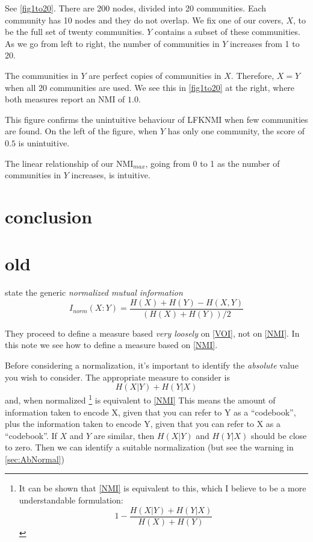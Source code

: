 \documentclass[9pt,technote]{IEEEtran}
\begin{document}
See \cref{fig1to20}. There are 200 nodes, divided into 20 communities. Each community has 10 nodes and they do not overlap.
We fix one of our covers, $X$, to be the full set of twenty communities. $Y$ contains a subset of these communities.
As we go from left to right, the number of communities in $Y$ increases from 1 to 20.

The communities in $Y$ are perfect copies of communities in $X$. Therefore, $X=Y$ when all 20 communities are used.
We see this in \cref{fig1to20} at the right, where both measures report an NMI of $1.0$.

This figure confirms the unintuitive behaviour of LFKNMI when few communities are found.
On the left of the figure, when $Y$ has only one community, the score of $0.5$ is unintuitive.

The linear relationship of our NMI$_{max}$, going from 0 to 1 as the number of communities in $Y$ increases, is intuitive.

\section{conclusion}







\break

\section{old}

 \citet{lancichinetti-2009} state the generic \emph{normalized mutual information}
 \begin{equation}
	 I_{norm}(X:Y) = \frac { H(X) + H(Y) - H(X,Y) } { \left( H(X) + H(Y) \right ) /2 }   \label{NMI}
 \end{equation}

They proceed to define a measure based \emph{very loosely} on \cref{VOI}, not on \cref{NMI}. In this note we see how to define a measure
based on \cref{NMI}.

Before considering a normalization, it's important to identify the \emph{absolute} value you wish to consider.
The appropriate measure to consider is
\begin{equation}
	H(X|Y) + H(Y|X)   \label{CorrectMI}
\end{equation}
and, when normalized \footnote{
	It can be shown that \cref{NMI} is equivalent to this, which I believe to be a more understandable formulation:
 \[
	1 - \frac { H(X|Y) + H(Y|X)  }{ H(X) + H(Y) } 
	\]
} is equivalent to \cref{NMI}
This means the amount of information taken to encode X, given that you can refer to Y as a ``codebook'', plus
the information taken to encode Y, given that you can refer to X as a ``codebook''. If $X$ and $Y$ are similar, then
$H(X|Y)$ and $H(Y|X)$ should be close to zero. Then we can identify a suitable normalization (but see the warning in \cref{sec:AbNormal})
\end{document}
